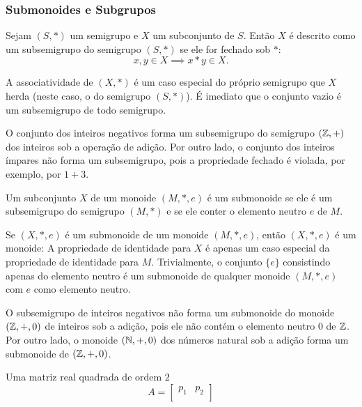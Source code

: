\begin{definition}[Magma]
      \subsubsection{Submonoides e Subgrupos}
         \begin{definition}[Subsemigrupos]
            Sejam $(S,*)$ um semigrupo e $X$ um subconjunto de $S$. Então $X$ é descrito como um subsemigrupo do semigrupo $(S,*)$ se ele for fechado sob $*$:
            $$x,y \in X \implies x * y \in X.$$
         \end{definition}
         A associatividade de $(X, *)$ é um caso especial do próprio semigrupo que $X$ herda (neste caso, o do semigrupo $(S,*)$). É imediato que o conjunto vazio é um subsemigrupo de todo semigrupo.
         \begin{exmp}
            O conjunto dos inteiros negativos forma um subsemigrupo do semigrupo $(\Z, +)$ dos inteiros sob a operação de adição. Por outro lado, o conjunto dos inteiros ímpares não forma um subsemigrupo, pois a propriedade fechado é violada, por exemplo, por $1 + 3$.
         \end{exmp}
         \begin{definition}[Submonoides]
            Um subconjunto $X$ de um monoide $(M,*,e)$ é um submonoide se ele é um subsemigrupo do semigrupo $(M,*)$ e se ele conter o elemento neutro $e$ de $M$.
         \end{definition}
         Se $(X,*,e)$ é um submonoide de um monoide $(M,*,e)$, então $(X,*,e)$ é um monoide: 
         A propriedade de identidade para $X$ é apenas um caso especial da propriedade de identidade para $M$. Trivialmente, o conjunto $\{e\}$ consistindo apenas do elemento neutro é um submonoide de qualquer monoide $(M,*,e)$ com $e$ como elemento neutro.
         \begin{exmp}
            O subsemigrupo de inteiros negativos não forma um submonoide do monoide $(\Z,+,0)$ de inteiros sob a adição, pois ele não contém o elemento neutro $0$ de $\Z$. Por outro lado, o monoide $(\N, +,0)$ dos números natural sob a adição forma um submonoide de $(\Z, +,0)$.
         \end{exmp}
         \begin{exmp}
            Uma matriz real quadrada de ordem $2$ $$A=
               \begin{bmatrix}
                  p_{1} & p_{2}\\

\end{bmatrix}$$
\end{exmp}
\end{definition}
